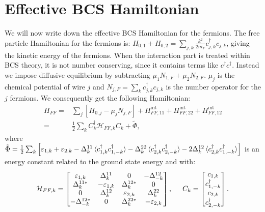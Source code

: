 \section{Effective BCS Hamiltonian} \label{sec.HFFfull}
We will now write down the effective BCS Hamiltonian for the fermions. The free particle Hamiltonian for the fermions is: $H_{0,1} + H_{0,2} = \sum_{j,k}\frac{k^2}{2m_F}c^\dagger_{j,k}c_{j,k}$, giving the kinetic energy of the fermions. When the interaction part is treated within BCS theory, it is not number conserving, since it contains terms like $c^\dagger c^\dagger$. Instead we impose diffusive equilibrium by subtracting $\mu_1N_{1,F}+\mu_2N_{2,F}$. $\mu_j$ is the chemical potential of wire $j$ and $N_{j,F} = \sum_k c^\dagger_{j,k}c_{j,k}$ is the number operator for the $j$ fermions. We consequently get the following Hamiltonian:
\begin{align}
H_{FF} = &\sum_j \left[H_{0,j} - \mu_j N_{j,F}\right] + H^\text{int}_{FF,11} + H^\text{int}_{FF,22} + H^\text{int}_{FF,12} \nonumber \\
       = &\frac{1}{2}\sum_k C^\dagger_k \mathcal{H}_{FF,k}C_k + \tilde{\Phi}, 
\label{eq.BCSHamiltonian}
\end{align}
where $\tilde{\Phi} = \frac{1}{2}\sum_k\left[\varepsilon_{1,k} + \varepsilon_{2,k} - \Delta^{11}_k\braket{c^\dagger_{1,k}c^\dagger_{1,-k}} - \Delta^{22}_k\braket{c^\dagger_{2,k}c^\dagger_{2,-k}} - 2\Delta^{12}_k\braket{c^\dagger_{2,k}c^\dagger_{1,-k}} \right]$ is an energy constant related to the ground state energy and with:
\begin{equation}
\mathcal{H}_{FF,k} = \begin{bmatrix} \varepsilon_{1,k} & \Delta^{11}_k      & 0                 & -\Delta^{12}_{-k} \\ 
                                     \Delta^{11 *}_k   & -\varepsilon_{1,k} & \Delta^{12*}_k    & 0 \\ 
                                    0                  & \Delta^{12}_k      & \varepsilon_{2,k} & \Delta^{22}_k \\ 
                                     -\Delta^{12*}_{-k}& 0                  & \Delta^{22*}_k    & -\varepsilon_{2,k} \end{bmatrix}, \hspace{0.5cm}
C_k =  \begin{bmatrix} c_{1,k} \\ c^\dagger_{1,-k} \\ c_{2,k} \\ c^\dagger_{2,-k} \end{bmatrix}.                                     
\end{equation}
